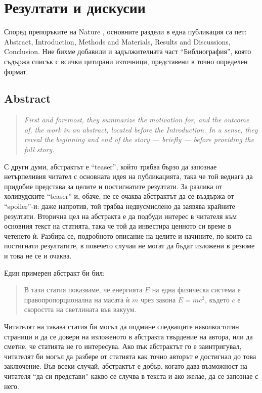 \documentclass[11pt, oneside]{article}     %
\newenvironment{quotenature}{\begin{quote}\itshape}{\cite{nature}\end{quote}}
\begin{document}
\section {Резултати и дискусии}

Според препоръките на Nature \cite{nature}, основните раздели в една публикация са пет: Abstract, Introduction, Methods and Materials, Results and Discussions, Conclusion. Ние бихме добавили и задължителната част ``Библиография'', която съдържа списък с всички цитирани източници, представени в точно определен формат.

\subsection*{Abstract}

\begin{quotenature}
  First and foremost, they summarize the motivation for, and the outcome of, the work in an abstract, located before the Introduction. In a sense, they reveal the beginning and end of the story — briefly — before providing the full story.
\end{quotenature}

С други думи, абстрактът е ``teaser'', който трябва бързо да запознае нетърпеливия читател с основната идея на публикацията, така че той веднага да придобие представа за целите и постигнатите резултати. За разлика от холивудските ``teaser''-и, обаче, не се очаква абстрактът да се въздържа от ``spoiler''-и: даже напротив, той трябва недвусмислено да заявява крайните резултати. Вторична цел на абстракта е да подбуди интерес в читателя към основния текст на статията, така че той да инвестира ценното си време в четенето ѝ. Разбира се, подробното описание на целите и начините, по които са постигнати резултатите, в повечето случаи не могат да бъдат изложени в резюме и това не се и очаква.

Един примерен абстракт би бил:
\begin{quote}
  В тази статия показваме, че енергията $E$ на една физическа система е правопропорционална на масата ѝ $m$ чрез закона $E=mc^2$, където $c$ е скоростта на светлината във вакуум.
\end{quote}
Читателят на такава статия би могъл да подмине следващите няколкостотин страници и да се довери на изложеното в абстракта твърдение на автора, или да сметне, че статията не го интересува. Ако пък абстрактът го е заинтригувал, читателят би могъл да разбере от статията как точно авторът е достигнал до това заключение. Във всеки случай, абстрактът е добър, когато дава възможност на читателя ``да си представи'' какво се случва в текста и ако желае, да се запознае с него.
\end{document}
